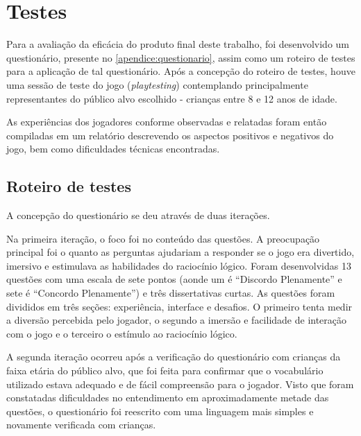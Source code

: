 
\chapter{Testes}\label{cap-testes}

Para a avaliação da eficácia do produto final deste trabalho, foi
desenvolvido um questionário, presente no \autoref{apendice:questionario}, 
assim como um roteiro de testes para a aplicação de tal 
questionário. Após a concepção do roteiro de testes, houve 
uma sessão de teste do jogo (\textit{playtesting}) contemplando 
principalmente representantes do público alvo escolhido - crianças 
entre 8 e 12 anos de idade.

As experiências dos jogadores conforme observadas e relatadas foram 
então compiladas em um relatório descrevendo os aspectos positivos e negativos 
do jogo, bem como dificuldades técnicas encontradas.

\section{Roteiro de testes}\label{sec-roteiro-testes}

A concepção do questionário se deu através de duas iterações.

Na primeira iteração, o foco foi no conteúdo das questões. A 
preocupação principal foi o quanto as perguntas ajudariam a 
responder se o jogo era divertido, imersivo e estimulava as 
habilidades do raciocínio lógico. Foram desenvolvidas 13 questões 
com uma escala de sete pontos (aonde um é ``Discordo Plenamente'' e sete 
é ``Concordo Plenamente'') e três dissertativas curtas. As questões 
foram divididos em três seções: experiência, interface e desafios. 
O primeiro tenta medir a diversão percebida pelo jogador, o segundo 
a imersão e facilidade de interação com o jogo e o terceiro o 
estímulo ao raciocínio lógico.

A segunda iteração ocorreu após a verificação do questionário com 
crianças da faixa etária do público alvo, que foi feita para 
confirmar que o vocabulário utilizado estava adequado e de fácil 
compreensão para o jogador. Visto que foram constatadas 
dificuldades no entendimento em aproximadamente metade das 
questões, o questionário foi reescrito com uma linguagem mais 
simples e novamente verificada com crianças.

